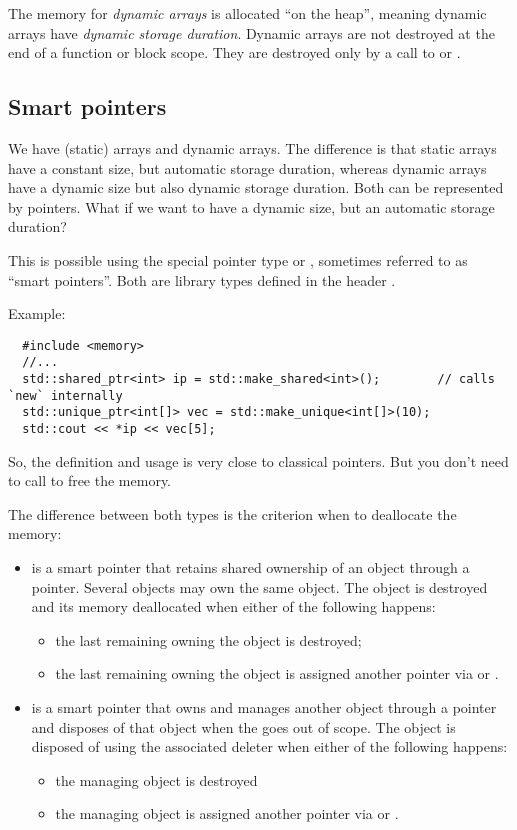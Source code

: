 The memory for \emph{dynamic arrays} is allocated ``on the heap'', meaning dynamic arrays have \emph{dynamic storage duration}. Dynamic arrays are not destroyed at
the end of a function or block scope. They are destroyed only by a call to  or .


\subsection{Smart pointers}
We have (static) arrays and dynamic arrays. The difference is that static arrays have a constant size, but automatic storage duration, whereas dynamic arrays
have a dynamic size but also dynamic storage duration. Both can be represented by pointers. What if we want to have a dynamic size, but an automatic
storage duration?

This is possible using the special pointer type  or , sometimes referred to as ``smart pointers''. Both are library
types defined in the header .

Example:
\begin{verbatim}
  #include <memory>
  //...
  std::shared_ptr<int> ip = std::make_shared<int>();        // calls `new` internally
  std::unique_ptr<int[]> vec = std::make_unique<int[]>(10);
  std::cout << *ip << vec[5];
\end{verbatim}
%
So, the definition and usage is very close to classical pointers. But you don't need to call  to free the memory.

The difference between both types is the criterion when to deallocate the memory:
\begin{itemize}
  \item {} is a smart pointer that retains shared ownership of an object through a pointer. Several  objects may own the
  same object. The object is destroyed and its memory deallocated when either of the following happens:
  \begin{itemize}
    \item the last remaining  owning the object is destroyed;
    \item the last remaining  owning the object is assigned another pointer via  or .
  \end{itemize}

  \item {} is a smart pointer that owns and manages another object through a pointer and disposes of that object when the
   goes out of scope. The object is disposed of using the associated deleter when either of the following happens:
  \begin{itemize}
    \item the managing  object is destroyed
    \item the managing  object is assigned another pointer via  or .
  \end{itemize}
\end{itemize}

